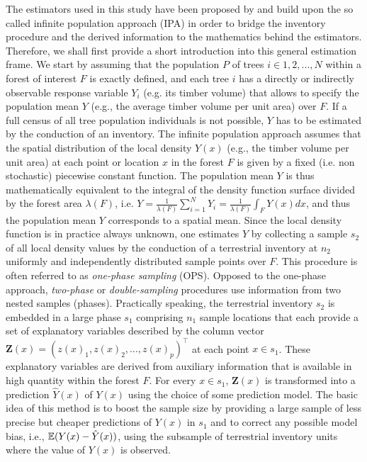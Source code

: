 The estimators used in this study have been proposed by \citep{mandallaz2013a,mandallaz2013b} and build upon the so called infinite population approach (IPA) in order to bridge the inventory procedure and the derived information to the mathematics behind the estimators. Therefore, we shall first provide a short introduction into this general estimation frame. We start by assuming that the population $P$ of trees $i \in 1,2, ..., N$ within a forest of interest $F$ is exactly defined, and each tree $i$ has a directly or indirectly observable response variable $Y_i$ (e.g. its timber volume) that allows to specify the population mean $Y$ (e.g., the average timber volume per unit area) over $F$. If a full census of all tree population individuals is not possible, $Y$ has to be estimated by the conduction of an inventory.  The infinite population approach assumes that the spatial distribution of the local density $Y(x)$ (e.g., the timber volume per unit area) at each point or location $x$ in the forest $F$ is given by a fixed (i.e. non stochastic) piecewise constant function. The population mean $Y$ is thus mathematically equivalent to the integral of the density function surface divided by the forest area $\lambda(F)$, i.e. $Y=\frac{1}{\lambda(F)} \sum_{i=1}^{N}Y_i=\frac{1}{\lambda(F)}\int_{F}Y(x)dx$, and thus the population mean $Y$ corresponds to a spatial mean. Since the local density function is in practice always unknown, one estimates $Y$ by collecting a sample $s_2$ of all local density values by the conduction of a terrestrial inventory at $n_2$ uniformly and independently distributed sample points over $F$. This procedure is often referred to as \textit{one-phase sampling} (OPS). Opposed to the one-phase approach, \textit{two-phase} or \textit{double-sampling} procedures use information from two nested samples (phases). Practically speaking, the terrestrial inventory $s_2$ is embedded in a large phase $s_1$ comprising $n_1$ sample locations that each provide a set of explanatory variables described by the column vector $\pmb{Z}(x)=(z(x)_1, z(x)_2,...,z(x)_p)^{\top}$ at each point $x \in s_1$. These explanatory variables are derived from auxiliary information that is available in high quantity within the forest $F$. For every $x \in s_1$, $\pmb{Z}(x)$ is transformed into a prediction $\hat{Y}(x)$ of $Y(x)$ using the choice of some prediction model. The basic idea of this method is to boost the sample size by providing a large sample of less precise but cheaper predictions of $Y(x)$ in $s_1$ and to correct any possible model bias, i.e., $\mathbb{E}{(Y(x)-\hat{Y}(x))}$, using the subsample of terrestrial inventory units where the value of $Y(x)$ is observed.



